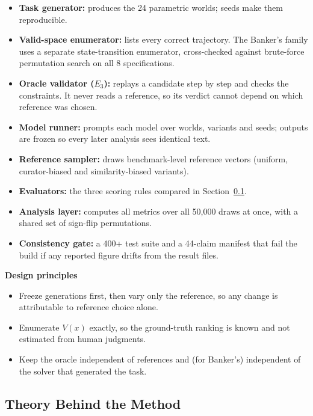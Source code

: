 \documentclass[11pt,a4paper]{article}
\newcommand{\E}[1]{E_{#1}}
\begin{document}
\begin{itemize}
\item \textbf{Task generator:} produces the 24 parametric worlds; seeds make them reproducible.
\item \textbf{Valid-space enumerator:} lists every correct trajectory. The Banker's family uses a separate state-transition enumerator, cross-checked against brute-force permutation search on all 8 specifications.
\item \textbf{Oracle validator ($\E3$):} replays a candidate step by step and checks the constraints. It never reads a reference, so its verdict cannot depend on which reference was chosen.
\item \textbf{Model runner:} prompts each model over worlds, variants and seeds; outputs are frozen so every later analysis sees identical text.
\item \textbf{Reference sampler:} draws benchmark-level reference vectors (uniform, curator-biased and similarity-biased variants).
\item \textbf{Evaluators:} the three scoring rules compared in Section~\ref{sec:theory}.
\item \textbf{Analysis layer:} computes all metrics over all 50,000 draws at once, with a shared set of sign-flip permutations.
\item \textbf{Consistency gate:} a 400+ test suite and a 44-claim manifest that fail the build if any reported figure drifts from the result files.
\end{itemize}

\textbf{Design principles}
\begin{itemize}
\item Freeze generations first, then vary only the reference, so any change is attributable to reference choice alone.
\item Enumerate $V(x)$ exactly, so the ground-truth ranking is known and not estimated from human judgments.
\item Keep the oracle independent of references and (for Banker's) independent of the solver that generated the task.
\end{itemize}

\subsection{Theory Behind the Method}\label{sec:theory}
\end{document}
